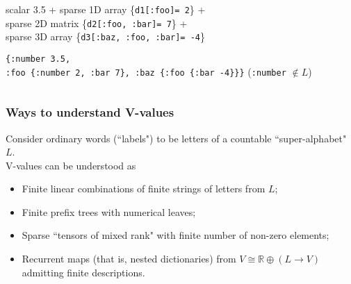 \documentclass{beamer}
\newcommand{\msmagenta}[1]{{\color{mymagenta} #1}}
\begin{document}
\begin{frame}
\begin{columns}[T]
\begin{column}{0.5\textwidth}
\begin{itemize}
{{ \item {\tiny  scalar 3.5 + sparse 1D array \{{\tt d1[:foo]= 2}\} +\\[1.5ex] sparse 2D
matrix \{{\tt d2[:foo, :bar]= 7}\} +\\  sparse 3D array \{{\tt d3[:baz, :foo, :bar]= -4}\}}

 \item {\tt \{:number 3.5,\\ :foo \{:number 2, :bar 7\}, :baz \{:foo \{:bar -4\}\}\}}
          ({\tt :number} $\not\in L$)
}
}

\end{itemize}

\end{column}
\end{columns}

\end{frame}



\begin{frame}

  \frametitle{\msmagenta{Ways to understand V-values}}

Consider ordinary words (``labels") to be letters of a countable ``super-alphabet" $L$.\\[2ex]

V-values can be understood as

\begin{itemize}

  \item Finite linear combinations of finite strings of letters from $L$;
  \item Finite prefix trees with numerical leaves;
  \item Sparse ``tensors of mixed rank" with finite number of non-zero elements;
  \item Recurrent maps (that is, nested dictionaries) from $V \cong \mathbb{R}\oplus (L \rightarrow V)$  admitting finite descriptions.

\end{itemize}

\end{frame}
\end{document}
